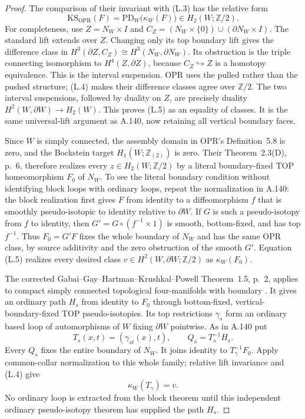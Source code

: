 \begin{proof}
The comparison of their invariant with (L.3) has the relative
form
\[
       \mathrm{KS}_{\mathrm{OPR}}(F)
          =\mathrm{PD}_W\bigl(\kappa_W(F)\bigr)
                   \in H_2(W;\mathbb Z/2).           \tag{L.5}
\]
For completeness, use $Z=N_W\times I$ and
$C_Z=(N_W\times\{0\})\cup(\partial N_W\times I)$.
The standard lift extends over $Z$. Changing only its top
boundary lift gives the difference class in
$H^3(\partial Z,C_Z)\cong H^3(N_W,\partial N_W)$.
Its obstruction is the triple connecting isomorphism to
$H^4(Z,\partial Z)$, because $C_Z\hookrightarrow Z$
is a homotopy equivalence. This is the interval suspension.
OPR uses the pulled rather than the pushed structure;
(L.4) makes their difference classes agree over $\mathbb Z/2$.
The two interval suspensions, followed by duality on $Z$,
are precisely duality
$H^2(W,\partial W)\to H_2(W)$. This proves (L.5) as an
equality of classes. It is the same universal-lift argument
as A.140, now retaining all vertical boundary faces.

Since $W$ is simply connected, the assembly domain in
OPR's Definition~5.8 is zero, and the Bockstein target
$H_1(W;\mathbb Z_{(2)})$ is zero. Their Theorem~2.3(D),
p.~6, therefore realizes every $z\in H_2(W;\mathbb Z/2)$
by a literal boundary-fixed TOP homeomorphism $F_0$ of
$N_W$. To see the literal boundary condition without
identifying block loops with ordinary loops, repeat the
normalization in A.140: the block realization first gives
$F$ from identity to a diffeomorphism $f$ that is smoothly
pseudo-isotopic to identity relative to $\partial W$.
If $G$ is such a pseudo-isotopy from $f$ to identity, then
$G'=G\circ(f^{-1}\times1)$ is smooth, bottom-fixed,
and has top $f^{-1}$. Thus $F_0=G'F$ fixes the whole
boundary of $N_W$ and has the same OPR class, by source
additivity and the zero obstruction of the smooth $G'$.
Equation (L.5) realizes every desired class
$v\in H^2(W,\partial W;\mathbb Z/2)$ as $\kappa_W(F_0)$.

The corrected Gabai--Gay--Hartman--Krushkal--Powell
Theorem~1.5, p.~2, applies to compact simply connected
topological four-manifolds with boundary
\cite{GabaiGayHartmanKrushkalPowell2026}.
It gives an ordinary path $H_s$ from identity to $F_0$
through bottom-fixed, vertical-boundary-fixed TOP
pseudo-isotopies. Its top restrictions $\gamma_s$
form an ordinary based loop of automorphisms of $W$
fixing $\partial W$ pointwise. As in A.140 put
\[
 T_s(x,t)=(\gamma_{st}(x),t),\qquad Q_s=T_s^{-1}H_s.
\]
Every $Q_s$ fixes the entire boundary of $N_W$.
It joins identity to $T_\gamma^{-1}F_0$.
Apply common-collar normalization to this whole family;
relative lift invariance and (L.4) give
\[
                \kappa_W(T_\gamma)=v.                \tag{L.6}
\]
No ordinary loop is extracted from the block theorem
until this independent ordinary pseudo-isotopy theorem
has supplied the path $H_s$.


\end{proof}
